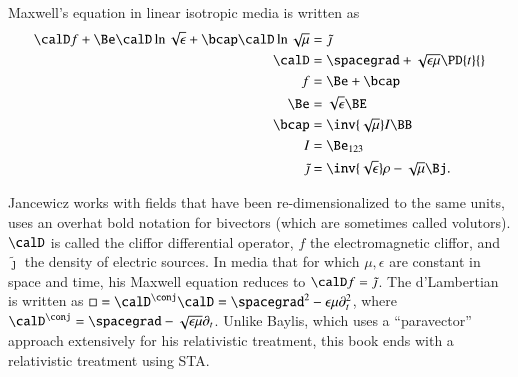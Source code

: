 Maxwell's equation in linear isotropic media is written as
\begin{dmath}\label{eqn:galiterature:20}
\begin{aligned}
\calD f + \Be \calD \ln \sqrt{\epsilon} + \bcap \calD \ln \sqrt{\mu} &= \tilde{\jmath} \\
\calD &= \spacegrad + \sqrt{\epsilon\mu} \PD{t}{} \\
f &= \Be + \bcap \\
\Be &= \sqrt{\epsilon} \BE \\
\bcap &= \inv{\sqrt{\mu}} I \BB \\
I &= \Be_{123} \\
\tilde{\jmath} &= \inv{\sqrt{\epsilon}}\rho - \sqrt{\mu} \Bj.
\end{aligned}
\end{dmath}

Jancewicz works with fields that have been re-dimensionalized to the same units, uses an overhat bold notation for bivectors (which are sometimes called volutors).
\( \calD \) is called the cliffor differential operator, \( f \) the electromagnetic cliffor, and \( \tilde{\jmath} \) the density of electric sources.
In media that for which \( \mu, \epsilon \) are constant in space and time, his Maxwell equation reduces to \( \calD f = \tilde{\jmath} \).
The d'Lambertian is written
as \( \Box = \calD^\conj \calD = \spacegrad^2 - \epsilon\mu \partial_t^2 \), where
\( \calD^\conj = \spacegrad - \sqrt{\epsilon\mu} \partial_t \).
Unlike Baylis, which uses a
``paravector'' approach extensively for his relativistic treatment,
this book ends with a relativistic treatment using STA.

